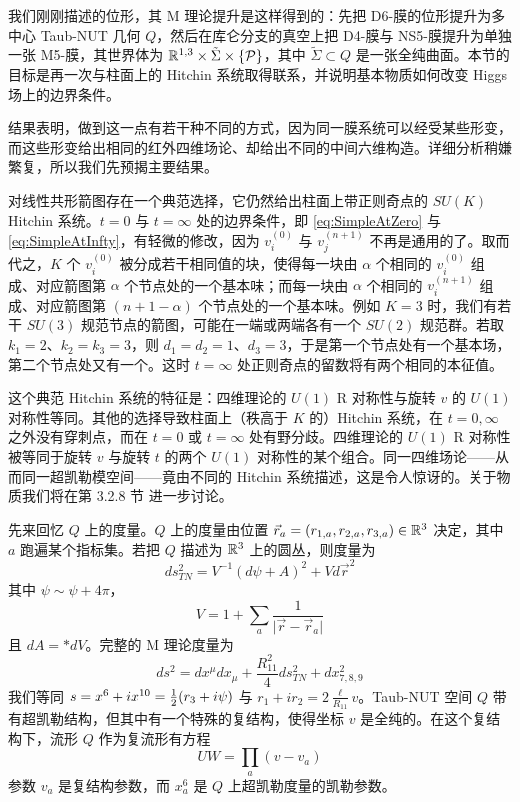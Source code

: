 我们刚刚描述的位形，其 M 理论提升是这样得到的：先把 D6-膜的位形提升为多中心 Taub-NUT 几何 $Q$，然后在库仑分支的真空上把 D4-膜与 NS5-膜提升为单独一张 M5-膜，其世界体为 $\mathbb{R}^{1,3} \times \tilde \Sigma \times \{\mathcal{P}\}$，其中 $\tilde \Sigma \subset Q$ 是一张全纯曲面。本节的目标是再一次与柱面上的 Hitchin 系统取得联系，并说明基本物质如何改变 Higgs 场上的边界条件。

结果表明，做到这一点有若干种不同的方式，因为同一膜系统可以经受某些形变，而这些形变给出相同的红外四维场论、却给出不同的中间六维构造。详细分析稍嫌繁复，所以我们先预揭主要结果。

对线性共形箭图存在一个典范选择，它仍然给出柱面上带正则奇点的 $SU(K)$ Hitchin 系统。$t=0$ 与 $t=\infty$ 处的边界条件，即 \eqref{eq:SimpleAtZero} 与 \eqref{eq:SimpleAtInfty}，有轻微的修改，因为 $v^{(0)}_i$ 与 $v^{(n+1)}_j$ 不再是通用的了。取而代之，$K$ 个 $v^{(0)}_i$ 被分成若干相同值的块，使得每一块由 $\alpha$ 个相同的 $v^{(0)}_i$ 组成、对应箭图第 $\alpha$ 个节点处的一个基本味；而每一块由 $\alpha$ 个相同的 $v^{(n+1)}_i$ 组成、对应箭图第 $(n+1-\alpha)$ 个节点处的一个基本味。例如 $K=3$ 时，我们有若干 $SU(3)$ 规范节点的箭图，可能在一端或两端各有一个 $SU(2)$ 规范群。若取 $k_1=2$、$k_2=k_3=3$，则 $d_1=d_2=1$、$d_3=3$，于是第一个节点处有一个基本场，第二个节点处又有一个。这时 $t=\infty$ 处正则奇点的留数将有两个相同的本征值。

这个典范 Hitchin 系统的特征是：四维理论的 $U(1)$ R 对称性与旋转 $v$ 的 $U(1)$ 对称性等同。其他的选择导致柱面上（秩高于 $K$ 的）Hitchin 系统，在 $t=0,\infty$ 之外没有穿刺点，而在 $t=0$ 或 $t=\infty$ 处有野分歧。四维理论的 $U(1)$ R 对称性被等同于旋转 $v$ 与旋转 $t$ 的两个 $U(1)$ 对称性的某个组合。同一四维场论——从而同一超凯勒模空间——竟由不同的 Hitchin 系统描述，这是令人惊讶的。关于物质我们将在第 3.2.8 节%
进一步讨论。

先来回忆 $Q$ 上的度量。$Q$ 上的度量由位置 $\vec r_a = (r_{1,a}, r_{2,a}, r_{3,a}) \in \mathbb{R}^3$ 决定，其中 $a$ 跑遍某个指标集。若把 $Q$ 描述为 $\mathbb{R}^3$ 上的圆丛，则度量为
\begin{equation}\label{eq:ch05-dsTN}
ds^2_{TN} = V^{-1} (d\psi +A)^2 + V d\vec r^2
\end{equation}
其中 $\psi \sim \psi + 4\pi$，
\begin{equation}\label{eq:ch05-V}
V =1 + \sum_{a} \frac{1}{\vert \vec r - \vec r_a\vert}
\end{equation}
且 $dA = *dV$。完整的 M 理论度量为
\begin{equation}\label{eq:ch05-dsM}
ds^2 = dx^\mu dx_\mu + \frac{R_{11}^2}{4} ds^2_{TN} + dx^2_{7,8,9}
\end{equation}
我们等同 $s = x^6 + i x^{10} = \tfrac{1}{2} ( r_3 + i \psi)$ 与 $r_1+i r_2 = 2 \frac{\ell}{R_{11} } v$。Taub-NUT 空间 $Q$ 带有超凯勒结构，但其中有一个特殊的复结构，使得坐标 $v$ 是全纯的。在这个复结构下，流形 $Q$ 作为复流形有方程
\begin{equation}\label{eq:MultiCenterTNa}
UW  = \prod_a (v-v_a)
\end{equation}
参数 $v_a$ 是复结构参数，而 $x^6_a$ 是 $Q$ 上超凯勒度量的凯勒参数。

